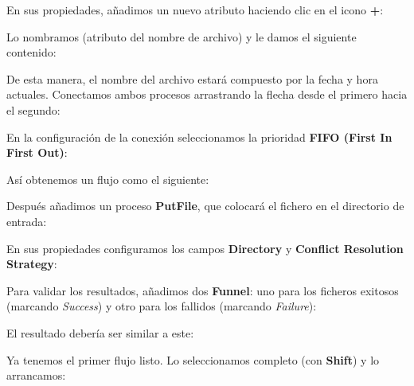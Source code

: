 \documentclass{../../miPlantilla}
\begin{document}

\newpage

En sus propiedades, añadimos un nuevo atributo haciendo clic en el icono \textbf{+}:


Lo nombramos  (atributo del nombre de archivo) y le damos el siguiente contenido:


De esta manera, el nombre del archivo estará compuesto por la fecha y hora actuales.  
Conectamos ambos procesos arrastrando la flecha desde el primero hacia el segundo:


En la configuración de la conexión seleccionamos la prioridad \textbf{FIFO (First In First Out)}:


Así obtenemos un flujo como el siguiente:


Después añadimos un proceso \textbf{PutFile}, que colocará el fichero en el directorio de entrada:


\newpage

En sus propiedades configuramos los campos \textbf{Directory} y \textbf{Conflict Resolution Strategy}:


Para validar los resultados, añadimos dos \textbf{Funnel}: uno para los ficheros exitosos (marcando \textit{Success}) y otro para los fallidos (marcando \textit{Failure}):

\begin{figure}[H]
    \centering
    \begin{minipage}{0.1\textwidth}  %
    \end{minipage}\hfill
    \begin{minipage}{0.8\textwidth}   %
    \end{minipage}
\end{figure}


\newpage

El resultado debería ser similar a este:


Ya tenemos el primer flujo listo. Lo seleccionamos completo (con \textbf{Shift}) y lo arrancamos:
\end{document}
